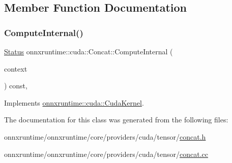 \subsection{Member Function Documentation}
\mbox{\label{classonnxruntime_1_1cuda_1_1Concat_aa94176487c440385c1248b6ca04772ea}} 
\subsubsection{\texorpdfstring{Compute\+Internal()}{ComputeInternal()}}
{\footnotesize\ttfamily \mbox{\hyperlink{classonnxruntime_1_1common_1_1Status}{Status}} onnxruntime\+::cuda\+::\+Concat\+::\+Compute\+Internal (\begin{DoxyParamCaption}\item[{\mbox{\hyperlink{classonnxruntime_1_1OpKernelContext}{Op\+Kernel\+Context}} $\ast$}]{context }\end{DoxyParamCaption}) const\hspace{0.3cm}{\ttfamily [override]}, {\ttfamily [virtual]}}



Implements \mbox{\hyperlink{classonnxruntime_1_1cuda_1_1CudaKernel_aca7af04ae448017d6023d30bba231ebb}{onnxruntime\+::cuda\+::\+Cuda\+Kernel}}.



The documentation for this class was generated from the following files\+:\begin{DoxyCompactItemize}
\item 
onnxruntime/onnxruntime/core/providers/cuda/tensor/\mbox{\hyperlink{cuda_2tensor_2concat_8h}{concat.\+h}}\item 
onnxruntime/onnxruntime/core/providers/cuda/tensor/\mbox{\hyperlink{cuda_2tensor_2concat_8cc}{concat.\+cc}}\end{DoxyCompactItemize}
